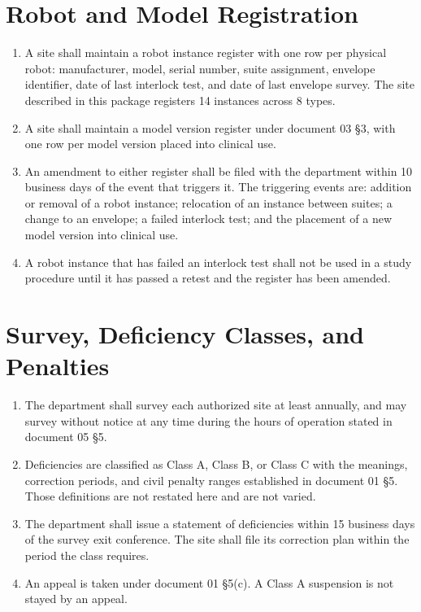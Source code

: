 \section{Robot and Model Registration}

\begin{enumerate}
\item A site shall maintain a robot instance register with one row per physical
  robot: manufacturer, model, serial number, suite assignment, envelope
  identifier, date of last interlock test, and date of last envelope survey. The
  site described in this package registers 14 instances across 8 types.

\item A site shall maintain a model version register under document 03 §3, with
  one row per model version placed into clinical use.

\item An amendment to either register shall be filed with the department within
  10 business days of the event that triggers it. The triggering events are:
  addition or removal of a robot instance; relocation of an instance between
  suites; a change to an envelope; a failed interlock test; and the placement of
  a new model version into clinical use.

\item A robot instance that has failed an interlock test shall not be used in a
  study procedure until it has passed a retest and the register has been
  amended.
\end{enumerate}

\section{Survey, Deficiency Classes, and Penalties}

\begin{enumerate}
\item The department shall survey each authorized site at least annually, and
  may survey without notice at any time during the hours of operation stated in
  document 05 §5.

\item Deficiencies are classified as Class A, Class B, or Class C with the
  meanings, correction periods, and civil penalty ranges established in document
  01 §5. Those definitions are not restated here and are not varied.

\item The department shall issue a statement of deficiencies within 15 business
  days of the survey exit conference. The site shall file its correction plan
  within the period the class requires.

\item An appeal is taken under document 01 §5(c). A Class A suspension is not
  stayed by an appeal.
\end{enumerate}


